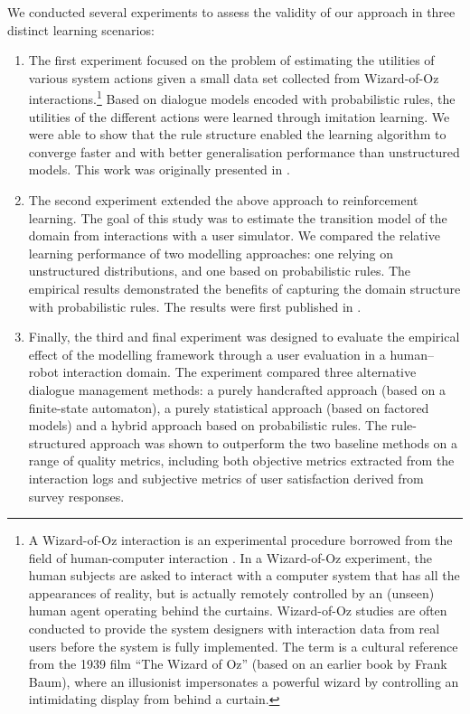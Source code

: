 We conducted several experiments to assess the validity of our approach in three distinct learning scenarios: \begin{enumerate} %
\item The first experiment focused on the problem of estimating the utilities of various system actions given a small data set collected from Wizard-of-Oz interactions.\footnote{A Wizard-of-Oz interaction is an experimental procedure borrowed from the field of human-computer interaction \citep{woz93}. In a Wizard-of-Oz experiment, the human subjects are asked to interact with a computer system that has all the appearances of reality, but is actually remotely controlled by an (unseen) human agent operating behind the curtains.  Wizard-of-Oz studies are often conducted to provide the system designers with interaction data from real users before the system is fully implemented.  The term is a cultural reference from the 1939 film ``The Wizard of Oz'' (based on an earlier book by Frank Baum), where an illusionist impersonates a powerful wizard by controlling an intimidating display from behind a curtain.}  Based on dialogue models encoded with probabilistic rules, the utilities of the different actions were learned through imitation learning. We were able to show that the rule structure enabled the learning algorithm to converge faster and with better generalisation performance than unstructured models. This work was originally presented in \citep{rulebasedmodels-sigdial2012}. 
\item The second experiment extended the above approach to reinforcement learning. The goal of this study was to estimate the transition model of the domain from interactions with a user simulator. We compared the relative learning performance of two modelling approaches: one relying on unstructured distributions, and one based on probabilistic rules. The empirical results demonstrated the benefits of capturing the domain structure with probabilistic rules. The results were first published in \citep{interspeech2013}. 
\item Finally, the third and final experiment was designed to evaluate the empirical effect of the modelling framework through a user evaluation in a human--robot interaction domain. The experiment compared three alternative dialogue management methods: a purely handcrafted approach (based on a finite-state automaton), a purely statistical approach (based on factored models) and a hybrid approach based on probabilistic rules. The rule-structured approach was shown to outperform the two baseline methods on a range of quality metrics, including both objective metrics extracted from the interaction logs and subjective metrics of user satisfaction derived from survey responses. 
\end{enumerate}


